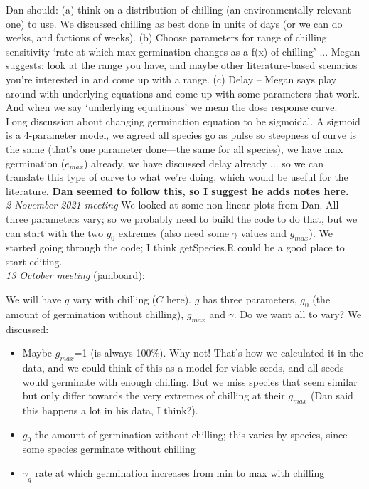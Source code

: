 \documentclass[11pt,letter]{article}
\begin{document}
Dan should: (a) think on a distribution of chilling (an environmentally relevant one) to use. We discussed chilling as best done in units of days (or we can do weeks, and factions of weeks). (b) Choose parameters for range of chilling sensitivity `rate at which max germination changes as a f(x) of chilling' ... Megan suggests: look at the range you have, and maybe other literature-based scenarios you're interested in and come up with a range. (c) Delay -- Megan says play around with underlying equations and come up with some parameters that work. And when we say `underlying equatinons' we mean the dose response curve.\\

Long discussion about changing germination equation to be sigmoidal. A sigmoid is a 4-parameter model, we agreed all species go as pulse so steepness of curve is the same (that's one parameter done---the same for all species), we have max germination ($e_{max}$) already, we have discussed delay already ... so we can translate this type of curve to what we're doing, which would be useful for the literature. {\bf Dan seemed to follow this, so I suggest he adds notes here.}\\

\emph{2 November 2021 meeting} We looked at some non-linear plots from Dan. All three parameters vary; so we probably need to build the code to do that, but we can start with the two $g_0$ extremes (also need some $\gamma$ values and $g_{max}$). We started going through the code; I think getSpecies.R could be a good place to start editing.  \\

\emph{13 October meeting} (\href{https://jamboard.google.com/d/1jvab46saD2Dey8uOg-C_ruWeGzxKyXvdBScyxB5FUCk/viewer?f=0}{jamboard}): 

We will have $g$ vary with chilling ($C$ here). $g$ has three parameters, $g_0$ (the amount of germination without chilling), $g_{max}$ and $\gamma$. Do we want all to vary? We discussed:

\begin{itemize}
\item Maybe $g_{max}$=1 (is always 100\%). Why not! That's how we calculated it in the data, and we could think of this as a model for viable seeds, and all seeds would germinate with enough chilling. But we miss species that seem similar but only differ towards the very extremes of chilling at their $g_{max}$ (Dan said this happens a lot in his data, I think?).
\item $g_0$ the amount of germination without chilling; this varies by species, since some species germinate without chilling
\item $\gamma_g$ rate at which germination increases from min to max with chilling
\end{itemize}
\end{document}
